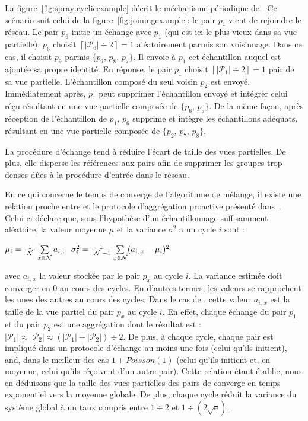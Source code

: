 La figure~\ref{fig:spray:cyclicexample} décrit le méchanisme périodique de \SPRAY. Ce
scénario suit celui de la figure~\ref{fig:joiningexample}: le pair $p_1$ vient
de rejoindre le réseau. Le pair $p_6$ initie un échange avec $p_1$ (qui est ici
le plus vieux dans sa vue partielle). $p_6$ choisit
$\left\lceil{|\mathcal{P}_6|\div 2}\right\rceil = 1$ aléatoirement parmis son
voisinnage. Dans ce cas, il choisit $p_9$ parmis $\{p_9,\,p_8,\,p_7\}$. Il
envoie à $p_1$ cet échantillon auquel est ajoutée sa propre identité. En
réponse, le pair $p_1$ choisit
$\left\lceil{|\mathcal{P}_1|\div 2}\right\rceil = 1$ pair de sa vue
partielle. L'échantillon composé du seul voisin $p_2$ est envoyé. Immédiatement
après, $p_1$ peut supprimer l'échantillon envoyé et intégrer celui réçu
résultant en une vue partielle composée de $\{p_6,\, p_9\}$. De la même façon,
après réception de l'échantillon de $p_1$, $p_6$ supprime et intègre les
échantillons adéquats, résultant en une vue partielle composée de
$\{p_2,\,p_7,\,p_8\}$.

La procédure d'échange tend à réduire l'écart de taille des vues partielles. De
plus, elle disperse les références aux pairs afin de supprimer les groupes trop
denses dûes à la procédure d'entrée dans le réseau.

En ce qui concerne le temps de converge de l'algorithme de mélange, il existe
une relation proche entre \SPRAY et le protocole d'aggrégation proactive
présenté dans~\cite{jelasity2004epidemic, montresor2004robust}. Celui-ci déclare
que, sous l'hypothèse d'un échantillonnage suffisamment aléatoire, la valeur
moyenne $\mu$ et la variance $\sigma^2$ a un cycle $i$ sont :
\begin{center}
  $\mu_i = {1\over{|\mathcal{N}|}} \sum\limits_{x \in \mathcal{N}} a_{i,\,x}$
  \hfill
  $\sigma^2_i = {1\over{|\mathcal{N}|-1}}\sum\limits_{x \in \mathcal{N}}
  (a_{i,\,x} - \mu_i)^2$
\end{center}
avec $a_{i,\,x}$ la valeur stockée par le pair $p_x$ au cycle $i$. La variance
estimée doit converger en 0 au cours des cycles. En d'autres termes, les valeurs
se rapprochent les unes des autres au cours des cycles. Dans le cas de \SPRAY,
cette valeur $a_{i,\,x}$ est la taille de la vue partiel du pair $p_x$ au cycle
$i$. En effet, chaque échange du pair $p_1$ et du pair $p_2$ est une aggrégation
dont le résultat est :
$|\mathcal{P}_1|\approx|\mathcal{P}_2|\approx{(|\mathcal{P}_1| +
  |\mathcal{P}_2|) \div 2}$.
De plus, à chaque cycle, chaque pair est impliqué dans un protocole d'échange au
moins une fois (celui qu'ils initient), and, dans le meilleur des cas
$1+Poisson(1)$ (celui qu'ils initient et, en moyenne, celui qu'ils réçoivent
d'un autre pair). Cette relation étant établie, nous en déduisons que la taille
des vues partielles des pairs de \SPRAY converge en temps exponentiel vers la
moyenne globale. De plus, chaque cycle réduit la variance du système global à un
taux compris entre ${1\div 2}$ et $1\div ({2\sqrt{\text{e}}})$.


